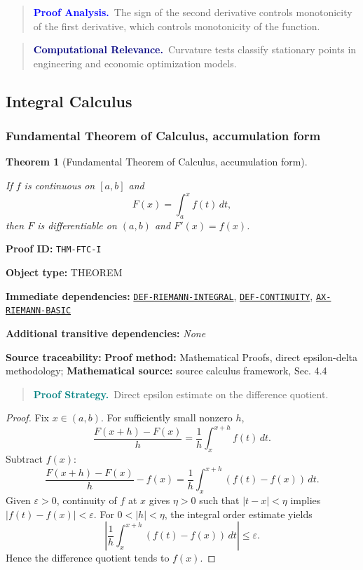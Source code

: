 \documentclass[10pt]{article}
\newcommand{\pidraw}[1]{\begingroup\urlstyle{tt}\nolinkurl{#1}\endgroup}
\newcommand{\pidref}[1]{\hyperref[prf:#1]{\pidraw{#1}}}
\newtheorem{theorem}{Theorem}[section]
\theoremstyle{definition}
\theoremstyle{remark}
\newenvironment{proofstrategy}
{\begin{quote}\small\noindent\textbf{\textcolor{teal}{Proof Strategy.}}\ }
{\end{quote}}
\newenvironment{proofanalysis}
{\begin{quote}\small\noindent\textbf{\textcolor{blue}{Proof Analysis.}}\ }
{\end{quote}}
\newenvironment{computationalrelevance}
{\begin{quote}\small\noindent\textbf{\textcolor{navy}{Computational Relevance.}}\ }
{\end{quote}}
\newcommand{\meta}[2]{\noindent\textbf{#1:} #2\par}
\begin{document}
\begin{proofanalysis}The sign of the second derivative controls monotonicity of the first derivative, which controls monotonicity of the function.\end{proofanalysis}

\begin{computationalrelevance}Curvature tests classify stationary points in engineering and economic optimization models.\end{computationalrelevance}

\subsection{Integral Calculus}

\subsubsection{Fundamental Theorem of Calculus, accumulation form}

\begin{theorem}[Fundamental Theorem of Calculus, accumulation form]\label{prf:THM-FTC-I}

If $f$ is continuous on $[a,b]$ and
\[
F(x)=\int_a^x f(t)\,dt,
\]
then $F$ is differentiable on $(a,b)$ and $F'(x)=f(x)$.

\end{theorem}

\meta{Proof ID}{\pidraw{THM-FTC-I}}
\meta{Object type}{THEOREM}
\meta{Immediate dependencies}{\pidref{DEF-RIEMANN-INTEGRAL}, \pidref{DEF-CONTINUITY}, \pidref{AX-RIEMANN-BASIC}}
\meta{Additional transitive dependencies}{\emph{None}}
\meta{Source traceability}{\textbf{Proof method:} Mathematical Proofs, direct epsilon-delta methodology; \textbf{Mathematical source:} source calculus framework, Sec. 4.4}

\begin{proofstrategy}Direct epsilon estimate on the difference quotient.\end{proofstrategy}

\begin{proof}

Fix $x\in(a,b)$. For sufficiently small nonzero $h$,
\[
\frac{F(x+h)-F(x)}{h}
=
\frac1h\int_x^{x+h}f(t)\,dt.
\]
Subtract $f(x)$:
\[
\frac{F(x+h)-F(x)}{h}-f(x)
=
\frac1h\int_x^{x+h}(f(t)-f(x))\,dt.
\]
Given $\varepsilon>0$, continuity of $f$ at $x$ gives $\eta>0$ such that
$|t-x|<\eta$ implies $|f(t)-f(x)|<\varepsilon$. For $0<|h|<\eta$, the
integral order estimate yields
\[
\left|
\frac1h\int_x^{x+h}(f(t)-f(x))\,dt
\right|
\le \varepsilon.
\]
Hence the difference quotient tends to $f(x)$.

\end{proof}
\end{document}
